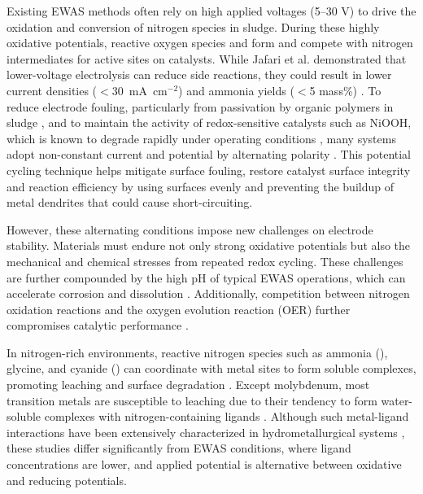 \documentclass[journal=jacsat,manuscript=article]{achemso}
\begin{document}
Existing EWAS methods often rely on high applied voltages (5–30 V) to drive the oxidation and conversion of nitrogen species in sludge. During these highly oxidative potentials, reactive oxygen species and form and compete with nitrogen intermediates for active sites on catalysts. While Jafari et al. \cite{JafariElectrochemicalProduction} demonstrated that lower-voltage electrolysis can reduce side reactions, they could result in lower current densities ($<$30~mA~cm$^{-2}$) and ammonia yields ($<$5 mass\%) \cite{Zhao2022AAmmonia}. To reduce electrode fouling, particularly from passivation by organic polymers in sludge \cite{Wang2014InCatalysts}, and to maintain the activity of redox-sensitive catalysts such as NiOOH, which is known to degrade rapidly under operating conditions \cite{JafariElectrochemicalProduction}, many systems adopt non-constant current and potential by alternating polarity \cite{Schotten2021AlternatingSynthesis, Hall2020SustainablePrinciples, Chandrasekar2008PulseApplications, Larson2012CurrentReview, Adamson2017ProbingVoltammetry}. This potential cycling technique helps mitigate surface fouling, restore catalyst surface integrity and reaction efficiency by using surfaces evenly and preventing the buildup of metal dendrites that could cause short-circuiting. 

However, these alternating conditions impose new challenges on electrode stability. Materials must endure not only strong oxidative potentials but also the mechanical and chemical stresses from repeated redox cycling. These challenges are further compounded by the high pH of typical EWAS operations, which can accelerate corrosion and dissolution \cite{Sanchis2022NitrateOverview, Popov2015ThermodynamicsCorrosion, Kapaka2010ElectrochemicalElectrode, Mucalo2004InSolutions, Aksu2001ElectrochemistrySolutions, OConnor2018ElectrochemicalSolutions}. Additionally, competition between nitrogen oxidation reactions and the oxygen evolution reaction (OER) further compromises catalytic performance \cite{Li2021Ru-DopedNitrate, Wang2022ElectrochemicalOxidation, Dai2020ElectrochemicalOxides}.

In nitrogen-rich environments, reactive nitrogen species such as ammonia (), glycine, and cyanide () can coordinate with metal sites to form soluble complexes, promoting leaching and surface degradation \cite{Bjerrum1957StabilitySubstances, Meng1996PrinciplesReview, Wang2022AmmoniaSystem}. Except molybdenum, most transition metals are susceptible to leaching due to their tendency to form water-soluble complexes with nitrogen-containing ligands \cite{Meng1996PrinciplesReview, Ma2021ALeaching, Wang2020Reduction-ammoniacalSalts, Li2025Glycine-mediatedStudy}. Although such metal-ligand interactions have been extensively characterized in hydrometallurgical systems \cite{Han1974AMMONIA-AMMONIUMNODULES, Bhuntumkomol1982TheSolutions, Azadi2021SustainableGlycine, Oraby2020GoldPermanganate, Sarvar2023ApplicationStructure, SPARROW1995CyanideApplications, Akcil2015PreciousReview, Wang2022AmmoniaSystem, Ma2021ALeaching, Wang2020Reduction-ammoniacalSalts, Li2025Glycine-mediatedStudy}, these studies differ significantly from EWAS conditions, where ligand concentrations are lower, and applied potential is alternative between oxidative and reducing potentials.
\end{document}
